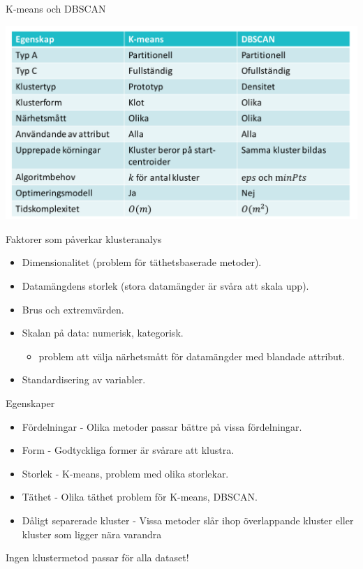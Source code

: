 \documentclass[10pt,english]{beamer}
\begin{document}
\begin{frame}{K-means och DBSCAN}

    \includegraphics[width=\textwidth]{figs/compre_k-mean_DBACAN.png}
    
\end{frame}

\begin{frame}{Faktorer som påverkar klusteranalys}
    \begin{itemize}
        \item Dimensionalitet (problem för täthetsbaserade metoder).
        \item Datamängdens storlek (stora datamängder är svåra att skala upp).
        \item Brus och extremvärden.
        \item Skalan på data: numerisk, kategorisk.
        \begin{itemize}
            \item problem att välja närhetsmått för datamängder med blandade attribut.
        \end{itemize}
        \item Standardisering av variabler.
    \end{itemize}
\end{frame}

\begin{frame}{Egenskaper}
    
\begin{itemize}
    \item Fördelningar - Olika metoder passar bättre på vissa fördelningar.
    \item Form - Godtyckliga former är svårare att klustra.
    \item Storlek - K-means, problem med olika storlekar.
    \item Täthet - Olika täthet problem för K-means, DBSCAN.
    \item Dåligt separerade kluster - Vissa metoder slår ihop överlappande kluster eller kluster som ligger nära varandra
\end{itemize}

\begin{redbox}
Ingen klustermetod passar för alla dataset!
\end{redbox}

\end{frame}
\end{document}
